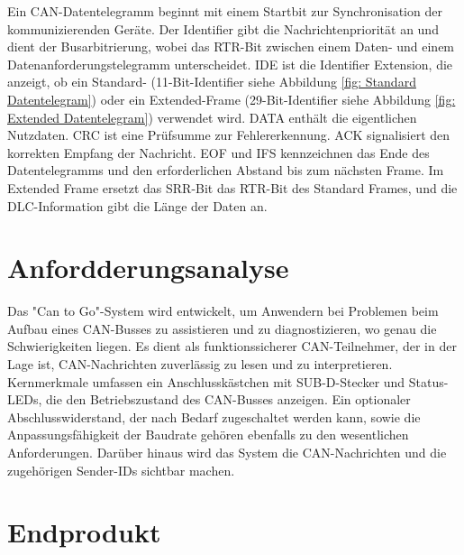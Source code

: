 \noindent Ein CAN-Datentelegramm beginnt mit einem Startbit zur Synchronisation der kommunizierenden Geräte. Der Identifier gibt die Nachrichtenpriorität an und dient der Busarbitrierung, wobei das RTR-Bit zwischen einem Daten- und einem Datenanforderungstelegramm unterscheidet. IDE ist die Identifier Extension, die anzeigt, ob ein Standard- (11-Bit-Identifier siehe Abbildung \ref{fig: Standard Datentelegram}) oder ein Extended-Frame (29-Bit-Identifier siehe Abbildung \ref{fig: Extended Datentelegram}) verwendet wird. DATA enthält die eigentlichen Nutzdaten. CRC ist eine Prüfsumme zur Fehlererkennung. ACK signalisiert den korrekten Empfang der Nachricht. EOF und IFS kennzeichnen das Ende des Datentelegramms und den erforderlichen Abstand bis zum nächsten Frame. Im Extended Frame ersetzt das SRR-Bit das RTR-Bit des Standard Frames, und die DLC-Information gibt die Länge der Daten an.\\

\section{Anfordderungsanalyse}
\noindent Das "Can to Go"-System wird entwickelt, um Anwendern bei Problemen beim Aufbau eines CAN-Busses zu assistieren und zu diagnostizieren, wo genau die Schwierigkeiten liegen. Es dient als funktionssicherer CAN-Teilnehmer, der in der Lage ist, CAN-Nachrichten zuverlässig zu lesen und zu interpretieren. Kernmerkmale umfassen ein Anschlusskästchen mit SUB-D-Stecker und Status-LEDs, die den Betriebszustand des CAN-Busses anzeigen. Ein optionaler Abschlusswiderstand, der nach Bedarf zugeschaltet werden kann, sowie die Anpassungsfähigkeit der Baudrate gehören ebenfalls zu den wesentlichen Anforderungen. Darüber hinaus wird das System die CAN-Nachrichten und die zugehörigen Sender-IDs sichtbar machen.\\


\section{Endprodukt}


